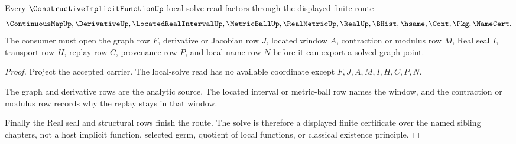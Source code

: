 \begin{theorem}
\label{thm:constructive-implicit-function-local-solve-route}
Every $\ConstructiveImplicitFunctionUp$ local-solve read factors through the displayed finite route
$$
\ContinuousMapUp,\DerivativeUp,\LocatedRealIntervalUp,\MetricBallUp,\RealMetricUp,\RealUp,\BHist,\hsame,\Cont,\Pkg,\NameCert.
$$
The consumer must open the graph row $F$, derivative or Jacobian row $J$, located window $A$, contraction or modulus row $M$, Real seal $I$, transport row $H$, replay row $C$, provenance row $P$, and local name row $N$ before it can export a solved graph point.
\end{theorem}
\begin{proof}
Project the accepted carrier. The local-solve read has no available coordinate except $F,J,A,M,I,H,C,P,N$.

The graph and derivative rows are the analytic source. The located interval or metric-ball row names the window, and the contraction or modulus row records why the replay stays in that window.

Finally the Real seal and structural rows finish the route. The solve is therefore a displayed finite certificate over the named sibling chapters, not a host implicit function, selected germ, quotient of local functions, or classical existence principle.
\end{proof}




